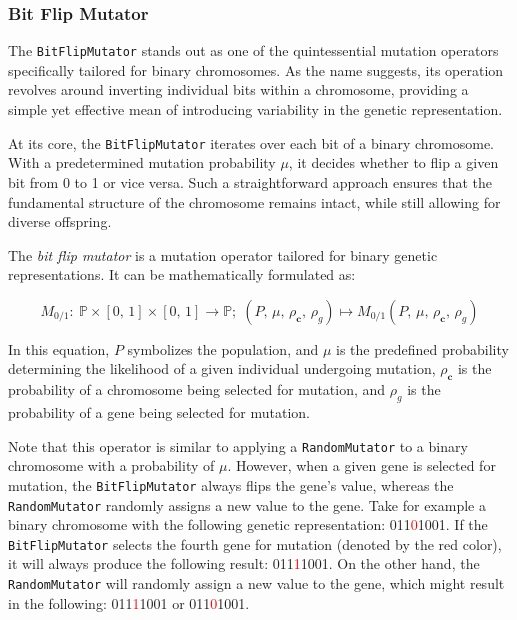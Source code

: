 
\subsubsection{Bit Flip Mutator}
\label{sec:keen:op:mut:bit_flip}

  The \texttt{BitFlipMutator} stands out as one of the quintessential mutation 
  operators specifically tailored for binary chromosomes. As the name suggests, 
  its operation revolves around inverting individual bits within a chromosome, 
  providing a simple yet effective mean of introducing variability in the 
  genetic representation.

  At its core, the \texttt{BitFlipMutator} iterates over each bit of a binary 
  chromosome. With a predetermined mutation probability \( \mu \), it decides 
  whether to flip a given bit from 0 to 1 or vice versa. Such a straightforward 
  approach ensures that the fundamental structure of the chromosome remains 
  intact, while still allowing for diverse offspring.

  \begin{definition}
    The \emph{bit flip mutator} is a mutation operator tailored for binary 
    genetic representations. It can be mathematically formulated as:

    \begin{equation}
      M_{0/1} :\: \mathbb{P} \times [0,\, 1] \times [0,\, 1] \to \mathbb{P};\;
      (P,\, \mu,\, \rho_\mathbf{c},\, \rho_g) 
        \mapsto M_{0/1}(P,\, \mu,\, \rho_\mathbf{c},\, \rho_g)
    \end{equation}

    In this equation, \(P\) symbolizes the population, and \(\mu\) is the 
    predefined probability determining the likelihood of a given individual
    undergoing mutation, \(\rho_\mathbf{c}\) is the probability of a chromosome
    being selected for mutation, and \(\rho_g\) is the probability of a gene
    being selected for mutation.
  \end{definition}

  Note that this operator is similar to applying a \texttt{RandomMutator} to a 
  binary chromosome with a probability of \(\mu\). However, when a given
  gene is selected for mutation, the \texttt{BitFlipMutator} always flips the
  gene's value, whereas the \texttt{RandomMutator} randomly assigns a new value
  to the gene. Take for example a binary chromosome with the following genetic
  representation: 011\textcolor{red}{0}1001. If the \texttt{BitFlipMutator}
  selects the fourth gene for mutation (denoted by the red color), it will
  always produce the following result: 011\textcolor{red}{1}1001. On the other
  hand, the \texttt{RandomMutator} will randomly assign a new value to the
  gene, which might result in the following: 011\textcolor{red}{1}1001 or
  011\textcolor{red}{0}1001.
